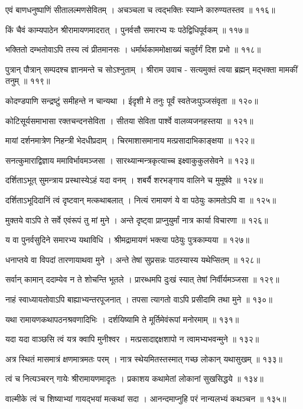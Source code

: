 एवं बाणधनुष्पाणिं सीतालल्मणसेवितम् ।
अचञ्चला च त्वद्भक्तिः स्याम्ने कारुण्यतस्तव ॥ ११६॥

किं चैवं काम्यपाठेन श्रीरामायणमादरात् ।
पुनर्वसौ समारभ्य यः पठेद्विधिपूर्वकम् ॥ ११७॥

भक्तितो दम्भतोवाऽपि तस्य त्वं प्रीतमानसः ।
धर्मार्थकाममोक्षाख्यं चतुर्वर्गं दिश प्रभो ॥ ११८॥

पुत्रान् पौत्रान् सम्पदश्च ज्ञानमन्ते च सोऽश्नुताम् ।
श्रीराम उवाच -
सत्यमुक्तं त्वया ब्रह्मन् मद्भक्ता मामकीं तनुम् ॥ ११९॥

कोदण्डपाणि सन्द्रष्टुं समीहन्ते न चान्यथा ।
ईदृशी मे तनुः पूर्वं स्वतेजःपुञ्जसंवृता ॥ १२०॥

कोटिसूर्यसमाभासा रक्तचन्दनसेविता ।
सीतया सेविता पार्श्वे वालव्यजनहस्तया ॥ १२१॥

मायां दर्शनमात्रेण निहन्त्री भेदधीप्रदाम् ।
चिरमाशासमानाय मत्प्रसादाभिकाङ्क्षया ॥ १२२॥

सनत्कुमाराद्विज्ञाय ममाविर्भावमञ्जसा ।
सारथ्यान्मन्त्रकृत्याच्च इक्ष्वाकुकुलसेवने ॥ १२३॥

दर्शिताऽभूत् सुमन्त्राय प्रस्थास्येऽहं यदा वनम् ।
शबर्यै शरभङ्गाय वालिने च मुमूर्षवे ॥ १२४॥

दर्शिताऽभूदिदानिं त्वं दृष्टवान् मत्कथाबलात् ।
नित्यं रामायणं ये वा पठेयुः कामतोऽपि वा ॥ १२५॥

मुक्तये वाऽपि ते सर्वे एवंरूपं तु मां मुने ।
अन्ते दृष्ट्वा प्राप्नुयुर्मां नात्र कार्या विचारणा ॥ १२६॥

य वा पुनर्वसुदिने समारभ्य यथाविधि ।
श्रीमद्रामायणं भक्त्या पठेयुः पुत्रकाम्यया ॥ १२७॥

धनाप्तये वा विपदां तारणायाथवा मुने ।
अन्ते तेषां सुप्रसन्नः पाठस्यास्य यथेप्सितम् ॥ १२८॥

सर्वान् कामान् ददाम्येव न ते शोचन्ति भूतले ।
प्रारब्धमपि दुःखं स्यात् तेषां निर्वीर्यमञ्जसा ॥ १२९॥

नाहं स्वाध्यायतोवाऽपि बाह्याभ्यन्तरपूजनात् ।
तपसा त्यागतो वाऽपि प्रसीदामि तथा मुने ॥ १३०॥

यथा रामायणकथापठनश्रवणादिभिः ।
दर्शयिष्यामि ते मूर्तिमेवंरूपां मनोरमाम् ॥ १३१॥

यदा यदा वाञ्छसि त्वं यत्र क्वापि मुनीश्वर ।
मत्प्रसादाद्दक्षशापो न त्वामभ्यभवन्मुने ॥ १३२॥

अत्र स्थितं मासमात्रं क्षणमात्रमतः परम् ।
नात्र स्थेयमितस्तस्मात् गच्छ लोकान् यथासुखम् ॥ १३३॥

त्वं च नित्यञ्चरन् गायेः श्रीरामायणमादृतः ।
प्रकाशय कथामेतां लोकानां सुखसिद्धये ॥ १३४॥

वाल्मीके त्वं च शिष्याभ्यां गायद्भयां मत्कथां सदा ।
आनन्दमाप्नुहि परं नान्यलभ्यं कथञ्चन ॥ १३५॥

